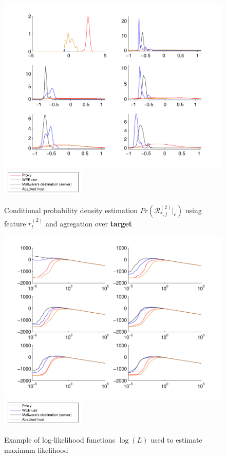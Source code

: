 \documentclass[a4paper]{IEEEtran}
\begin{document}
\begin{figure}[t!]%
  \centering
  \includegraphics[width=140mm]{dens_dst_logp}
      \includegraphics[width=40mm]{legend}
  \caption{Conditional probability density estimation $Pr ( \mathcal{R}^{(2)}_{*,j}|_e ) $ using feature $r_t^{(2)}$ and agregation over \textbf{target}}
  \label{fig:dens_dst_logp}
\end{figure}
\begin{figure}[t!]%
  \centering
  \includegraphics[width=140mm]{loglik_src_bdivp}
  \includegraphics[width=40mm]{legend}
    \caption{Example of log-likelihood functions $\log(L)$ used to estimate maximum likelihood}
  \label{fig:loglik_src_bdivp}
\end{figure}
\end{document}
